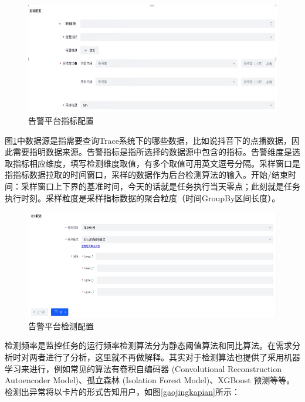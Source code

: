 \begin{figure}[htb]
  \centering
  \includegraphics[width=5in]{figure/chapter4/告警平台指标配置.jpg}
  \caption{告警平台指标配置}\label{gaojingzhibiao}
\end{figure}

图\ref{gaojingzhibiao}中数据源是指需要查询Trace系统下的哪些数据，比如说抖音下的点播数据，因此需要指明数据来源。告警指标是指所选择的数据源中包含的指标。告警维度是选取指标相应维度，填写检测维度取值，有多个取值可用英文逗号分隔。采样窗口\cite{hasanin2019severely}是指指标数据拉取的时间窗口，采样的数据作为后台检测算法的输入。开始/结束时间：采样窗口上下界的基准时间，今天的话就是任务执行当天零点；此刻就是任务执行时刻。采样粒度是采样指标数据的聚合粒度（时间GroupBy区间长度）。
\begin{figure}[htb]
  \centering
  \includegraphics[width=5in]{figure/chapter4/ 告警平台检测配置.jpg}
  \caption{告警平台检测配置}\label{gaojingjice}
\end{figure}
检测频率是监控任务的运行频率检测算法分为静态阈值算法和同比算法。在需求分析时对两者进行了分析，这里就不再做解释。其实对于检测算法也提供了采用机器学习来进行，例如常见的算法有卷积自编码器 (Convolutional Reconstruction Autoencoder Model)、孤立森林 (Isolation Forest Model)、XGBoost 预测等等。检测出异常将以卡片的形式告知用户，如图\ref{gaojingkapian}所示：

